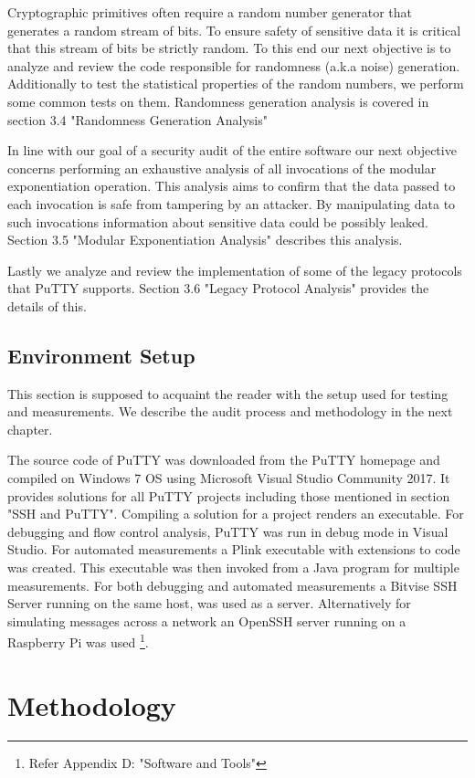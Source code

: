 \documentclass{bhamthesis}
\begin{document}
Cryptographic primitives often require a random number generator that generates a random stream of bits. To ensure safety of sensitive data it is critical that this stream of bits be strictly random. To this end our next objective is to analyze and review the code responsible for randomness (a.k.a noise) generation. Additionally to test the statistical properties of the random numbers, we perform some common tests on them. Randomness generation analysis is covered in section 3.4 "Randomness Generation Analysis"\par
In line with our goal of a security audit of the entire software our next objective concerns performing an exhaustive analysis of all invocations of the modular exponentiation operation. This analysis aims to confirm that the data passed to each invocation is safe from tampering by an attacker. By manipulating data to such invocations information about sensitive data could be possibly leaked. Section 3.5 "Modular Exponentiation Analysis" describes this analysis.\par
Lastly we analyze and review the implementation of some of the legacy protocols that PuTTY supports. Section 3.6 "Legacy Protocol Analysis" provides the details of this.\par
\section{Environment Setup}
This section is supposed to acquaint the reader with the setup used for testing and measurements. We describe the audit process and methodology in the next chapter.\par

The source code of PuTTY was downloaded from the PuTTY homepage \cite{putty} and compiled on Windows 7 OS using Microsoft Visual Studio Community 2017. It provides solutions for all PuTTY projects including those mentioned in section "SSH and PuTTY". Compiling a solution for a project renders an executable. For debugging and flow control analysis, PuTTY was run in debug mode in Visual Studio. For automated measurements a Plink executable with extensions to code was created. This executable was then invoked from a Java program for multiple measurements. For both debugging and automated measurements a Bitvise SSH Server running on the same host, was used as a server. Alternatively for simulating messages across a network an OpenSSH server running on a Raspberry Pi was used \footnote{Refer Appendix D: "Software and Tools"}.
\chapter{Methodology}
\end{document}
